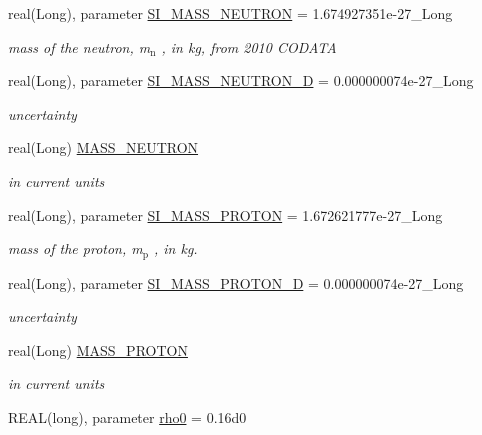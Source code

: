 \begin{DoxyCompactItemize}
real(Long), parameter \hyperlink{namespacephys__cons_ab117ad83bb79e4ed199d17f3c63ec4b3}{SI\_\-MASS\_\-NEUTRON} = 1.674927351e-\/27\_\-Long
\begin{DoxyCompactList}\small\item\em mass of the neutron, m$_{\mbox{n}}$ , in kg, from 2010 CODATA \item\end{DoxyCompactList}\item 
real(Long), parameter \hyperlink{namespacephys__cons_af635c94d544c5bc6dcb05186a9f81d84}{SI\_\-MASS\_\-NEUTRON\_\-D} = 0.000000074e-\/27\_\-Long
\begin{DoxyCompactList}\small\item\em uncertainty \item\end{DoxyCompactList}\item 
real(Long) \hyperlink{namespacephys__cons_abeff422917cc48601644e90ab12fb7c0}{MASS\_\-NEUTRON}
\begin{DoxyCompactList}\small\item\em in current units \item\end{DoxyCompactList}\item 
real(Long), parameter \hyperlink{namespacephys__cons_a6a740864089f117512dc89ea53f3dc5f}{SI\_\-MASS\_\-PROTON} = 1.672621777e-\/27\_\-Long
\begin{DoxyCompactList}\small\item\em mass of the proton, m$_{\mbox{p}}$ , in kg. \item\end{DoxyCompactList}\item 
real(Long), parameter \hyperlink{namespacephys__cons_a3c37a18a918519962cfc26597082d53d}{SI\_\-MASS\_\-PROTON\_\-D} = 0.000000074e-\/27\_\-Long
\begin{DoxyCompactList}\small\item\em uncertainty \item\end{DoxyCompactList}\item 
real(Long) \hyperlink{namespacephys__cons_a20e8ed3d7ff389588ce024048c5ccf85}{MASS\_\-PROTON}
\begin{DoxyCompactList}\small\item\em in current units \item\end{DoxyCompactList}\item 
REAL(long), parameter \hyperlink{namespacephys__cons_a4b10513970a98ad78b85723c60d9a8b6}{rho0} = 0.16d0

\end{DoxyCompactItemize}
